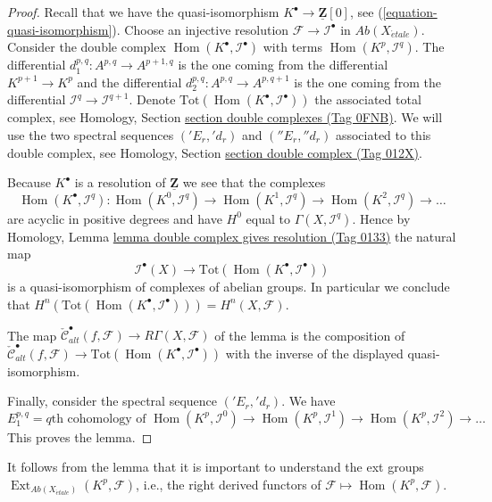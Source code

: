 \documentclass{amsart}
\theoremstyle{plain}
\theoremstyle{definition}
\theoremstyle{remark}
\numberwithin{equation}{subsection}
\def\Hom{\mathop{\mathrm{Hom}}\nolimits}
\def\Ext{\mathop{\mathrm{Ext}}\nolimits}
\def\etale{{\acute{e}tale}}
\begin{document}
\begin{proof}
Recall that we have the quasi-isomorphism
$K^\bullet \to \underline{\mathbf{Z}}[0]$, see
(\ref{equation-quasi-isomorphism}).
Choose an injective resolution $\mathcal{F} \to \mathcal{I}^\bullet$
in $\textit{Ab}(X_\etale)$. Consider the double complex
$\Hom(K^\bullet, \mathcal{I}^\bullet)$ with terms
$\Hom(K^p, \mathcal{I}^q)$. The differential
$d_1^{p, q} : A^{p, q} \to A^{p + 1, q}$
is the one coming from the differential $K^{p + 1} \to K^p$
and the differential $d_2^{p, q} : A^{p, q} \to A^{p, q + 1}$ is the
one coming from the differential
$\mathcal{I}^q \to \mathcal{I}^{q + 1}$.
Denote $\text{Tot}(\Hom(K^\bullet, \mathcal{I}^\bullet))$
the associated total complex, see
Homology, Section \href{https://stacks.math.columbia.edu/tag/0FNB}{section double complexes (Tag 0FNB)}.
We will use the two spectral
sequences $({}'E_r, {}'d_r)$ and $({}''E_r, {}''d_r)$
associated to this double complex, see
Homology, Section \href{https://stacks.math.columbia.edu/tag/012X}{section double complex (Tag 012X)}.

\medskip\noindent
Because $K^\bullet$ is a resolution of $\underline{\mathbf{Z}}$
we see that the complexes
$$
\Hom(K^\bullet, \mathcal{I}^q) :
\Hom(K^0, \mathcal{I}^q) \to
\Hom(K^1, \mathcal{I}^q) \to
\Hom(K^2, \mathcal{I}^q) \to \ldots
$$
are acyclic in positive degrees and have $H^0$ equal to
$\Gamma(X, \mathcal{I}^q)$. Hence by
Homology, Lemma \href{https://stacks.math.columbia.edu/tag/0133}{lemma double complex gives resolution (Tag 0133)}
the natural map
$$
\mathcal{I}^\bullet(X) \longrightarrow
\text{Tot}(\Hom(K^\bullet, \mathcal{I}^\bullet))
$$
is a quasi-isomorphism of complexes of abelian groups. In particular
we conclude that
$H^n(\text{Tot}(\Hom(K^\bullet, \mathcal{I}^\bullet))) = H^n(X, \mathcal{F})$.

\medskip\noindent
The map $\check{\mathcal{C}}^\bullet_{alt}(f, \mathcal{F}) \to
R\Gamma(X, \mathcal{F})$ of the lemma is the composition of
$\check{\mathcal{C}}^\bullet_{alt}(f, \mathcal{F}) \to
\text{Tot}(\Hom(K^\bullet, \mathcal{I}^\bullet))$
with the inverse of the displayed quasi-isomorphism.

\medskip\noindent
Finally, consider the spectral sequence $({}'E_r, {}'d_r)$.
We have
$$
E_1^{p, q} = q\text{th cohomology of }
\Hom(K^p, \mathcal{I}^0) \to
\Hom(K^p, \mathcal{I}^1) \to
\Hom(K^p, \mathcal{I}^2) \to \ldots
$$
This proves the lemma.
\end{proof}

\noindent
It follows from the lemma that it is important to understand the
ext groups $\Ext_{\textit{Ab}(X_\etale)}(K^p, \mathcal{F})$,
i.e., the right derived functors of
$\mathcal{F} \mapsto \Hom(K^p, \mathcal{F})$.
\end{document}
